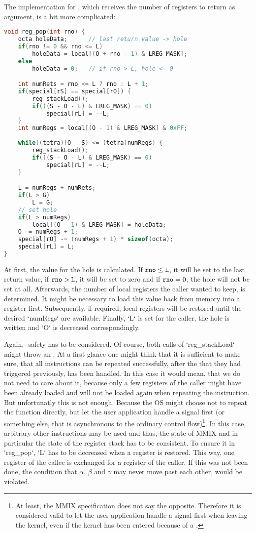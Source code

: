 The implementation for , which receives the number of registers to return as argument, is a bit more complicated:
\begin{lstlisting}[language=C,caption=Implementation of {\tt reg\_pop}]
void reg_pop(int rno) {
	octa holeData;		// last return value -> hole
	if(rno != 0 && rno <= L)
		holeData = local[(O + rno - 1) & LREG_MASK];
	else
		holeData = 0;	// if rno > L, hole <- 0

	int numRets = rno <= L ? rno : L + 1;
	if(special[rS] == special[rO]) {
		reg_stackLoad();
		if(((S - O - L) & LREG_MASK) == 0)
			special[rL] = --L;
	}
	int numRegs = local[(O - 1) & LREG_MASK] & 0xFF;
	
	while((tetra)(O - S) <= (tetra)numRegs) {
		reg_stackLoad();
		if(((S - O - L) & LREG_MASK) == 0)
			special[rL] = --L;
	}

	L = numRegs + numRets;
	if(L > G)
		L = G;
	// set hole
	if(L > numRegs)
		local[(O - 1) & LREG_MASK] = holeData;
	O -= numRegs + 1;
	special[rO] -= (numRegs + 1) * sizeof(octa);
	special[rL] = L;
}
\end{lstlisting}
At first, the value for the hole is calculated. If ${\tt rno} \le {\tt L}$, it will be set to the last return value, if ${\tt rno} > {\tt L}$, it will be set to zero and if ${\tt rno} = 0$, the hole will not be set at all. Afterwards, the number of local registers the caller wanted to keep, is determined. It might be necessary to load this value back from memory into a register first. Subsequently, if required, local registers will be restored until the desired `numRegs` are available. Finally, `L` is set for the caller, the hole is written and `O` is decreased correspondingly.

Again, -safety has to be considered. Of course, both calls of `reg_stackLoad` might throw an . At a first glance one might think that it is sufficient to make sure, that all instructions can be repeated successfully, after the  that they had triggered previously, has been handled. In this case it would mean, that we do not need to care about it, because only a few registers of the caller might have been already loaded and will not be loaded again when repeating the instruction. But unfortunatly this is not enough. Because the OS might choose not to repeat the function directly, but \eg let the user application handle a signal first (or something else, that is asynchronous to the ordinary control flow)\footnote{At least, the MMIX specification does not say the opposite. Therefore it is considered valid to let the user application handle a signal first when leaving the kernel, even if the kernel has been entered because of a .}. In this case, arbitrary other instructions may be used and thus, the state of MMIX and in particular the state of the register stack has to be consistent. To ensure it in `reg_pop`, `L` has to be decreased when a register is restored. This way, one register of the callee is exchanged for a register of the caller. If this was not been done, the condition that $\alpha$, $\beta$ and $\gamma$ may never move past each other, would be violated.

